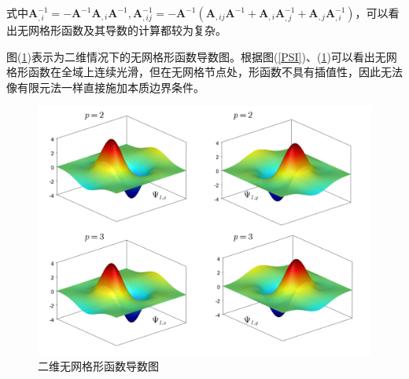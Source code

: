 式中$\pmb A_{,i}^{-1}=-\pmb A^{-1}\pmb A_{,i}\pmb A^{-1},\pmb A_{,ij}^{-1}=-\pmb A^{-1}(\pmb A_{,ij}\pmb A^{-1}+\pmb A_{,i}\pmb A_{,j}^{-1}+\pmb A_{,j}\pmb A_{,i}^{-1})$，可以看出无网格形函数及其导数的计算都较为复杂。\par
图(\ref{DPASI})表示为二维情况下的无网格形函数导数图。根据图(\ref{PSI})、(\ref{DPASI})可以看出无网格形函数在全域上连续光滑，但在无网格节点处，形函数不具有插值性，因此无法像有限元法一样直接施加本质边界条件。
\begin{figure}[!h]
    \centering
\includegraphics[scale=0.5]{figure/E/DPASI.png}
\caption{二维无网格形函数导数图}\label{DPASI}
\end{figure}\newpage
